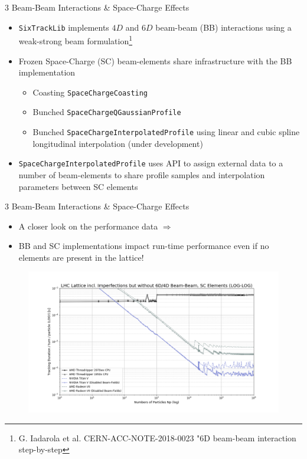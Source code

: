 \documentclass{beamer}
\begin{document}

\begin{frame}{3 Beam-Beam Interactions \& Space-Charge Effects}
\begin{itemize}
    \item  \texttt{SixTrackLib} implements $4D$ and $6D$ beam-beam (BB) interactions using a weak-strong beam formulation\footnote{G. Iadarola et al. CERN-ACC-NOTE-2018-0023 "6D beam-beam interaction step-by-step}
    \item Frozen Space-Charge (SC) beam-elements share infrastructure with the BB implementation
    \begin{itemize}
        \item Coasting \texttt{SpaceChargeCoasting}
        \item Bunched \texttt{SpaceChargeQGaussianProfile}
        \item Bunched \texttt{SpaceChargeInterpolatedProfile} using linear and cubic spline longitudinal interpolation (under development)
    \end{itemize}        
    \item \texttt{SpaceChargeInterpolatedProfile} uses API to assign external data to a number of beam-elements to share profile samples and interpolation parameters between SC elements
\end{itemize}
\end{frame}

\begin{frame}{3 Beam-Beam Interactions \& Space-Charge Effects}
\begin{itemize}
    \item A closer look on the performance data $\Longrightarrow$
    \item BB and SC implementations impact run-time performance even if no elements are present in the lattice!
\end{itemize}
\begin{figure}[h]
    \centering
    \includegraphics[width=\textwidth]{images/performance_analysis_04.png}
\end{figure}
\end{frame}
\end{document}
